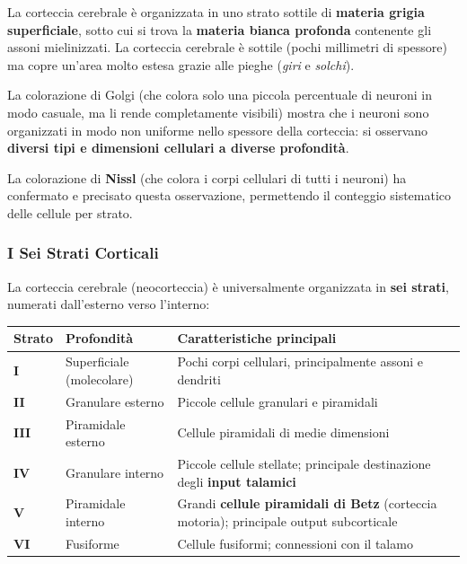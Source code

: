 La corteccia cerebrale è organizzata in uno strato sottile di \textbf{materia grigia superficiale}, sotto cui si trova la \textbf{materia bianca profonda} contenente gli assoni mielinizzati. 
La corteccia cerebrale è sottile (pochi millimetri di spessore) ma copre un'area molto estesa grazie alle pieghe (\textit{giri} e \textit{solchi}).

La colorazione di Golgi (che colora solo una piccola percentuale di neuroni in modo casuale, ma li rende completamente visibili) mostra che i neuroni sono organizzati in modo non uniforme nello spessore della corteccia: si osservano \textbf{diversi tipi e dimensioni cellulari a diverse profondità}.

La colorazione di \textbf{Nissl} (che colora i corpi cellulari di tutti i neuroni) ha confermato e precisato questa osservazione, permettendo il conteggio sistematico delle cellule per strato.

\subsubsection{I Sei Strati Corticali}

La corteccia cerebrale (neocorteccia) è universalmente organizzata in \textbf{sei strati}, numerati dall'esterno verso l'interno:

\begin{table}[htbp]
    \centering
    \renewcommand{\arraystretch}{1.3}
    \begin{tabularx}{\textwidth}{|l|l|X|}
    \hline
    \textbf{Strato} & \textbf{Profondità} & \textbf{Caratteristiche principali} \\
    \hline
    \textbf{I} & Superficiale (molecolare) & Pochi corpi cellulari, principalmente assoni e dendriti \\
    \textbf{II} & Granulare esterno & Piccole cellule granulari e piramidali \\
    \textbf{III} & Piramidale esterno & Cellule piramidali di medie dimensioni \\
    \textbf{IV} & Granulare interno & Piccole cellule stellate; principale destinazione degli \textbf{input talamici} \\
    \textbf{V} & Piramidale interno & Grandi \textbf{cellule piramidali di Betz} (corteccia motoria); principale output subcorticale \\
    \textbf{VI} & Fusiforme & Cellule fusiformi; connessioni con il talamo \\
    \hline
    \end{tabularx}
\end{table}



